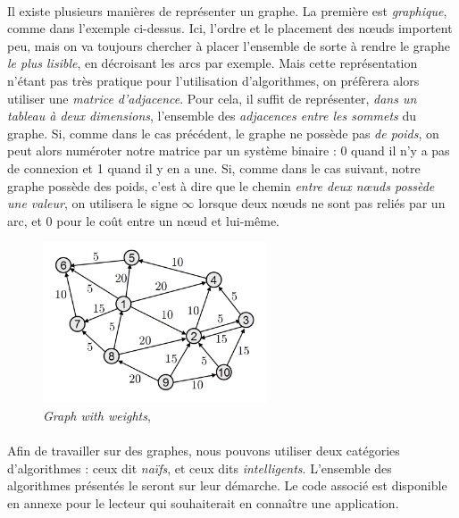 \paragraph{} Il existe plusieurs manières de représenter un graphe. La première est \emph{graphique}, comme dans 
l'exemple ci-dessus. Ici, l'ordre et le placement des n\oe{}uds importent peu, mais on va toujours chercher à placer
l'ensemble de sorte à rendre le graphe \emph{le plus lisible}, en décroisant les arcs par exemple. Mais cette représentation
n'étant pas très pratique pour l'utilisation d'algorithmes, on préfèrera alors utiliser une \emph{matrice d'adjacence}.
Pour cela, il suffit de représenter, \emph{dans un tableau à deux dimensions}, l'ensemble des \emph{adjacences entre les
sommets} du graphe. Si, comme dans le cas précédent, le graphe ne possède pas \emph{de poids}, on peut alors numéroter
notre matrice par un système binaire : 0 quand il n'y a pas de connexion et 1 quand il y en a une. Si, comme dans le cas
suivant, notre graphe possède des poids, c'est à dire que le chemin \emph{entre deux n\oe{}uds possède une valeur}, on
utilisera le signe $\infty$ lorsque deux n\oe{}uds ne sont pas reliés par un arc, et 0 pour le coût entre un n\oe{}ud et
lui-même.

\begin{figure}[h]
    \centering
    \includegraphics[width=250px]{chapters/03/images/weighted_graph.png}
    \caption{\label{weighted_graph}\emph{Graph with weights}, \cite{GraphTheory1}}
\end{figure}

\paragraph{} Afin de travailler sur des graphes, nous pouvons utiliser deux catégories d'algorithmes : ceux dit \emph{naïfs},
et ceux dits \emph{intelligents}. L'ensemble des algorithmes présentés le seront sur leur démarche. Le code associé est
disponible en annexe pour le lecteur qui souhaiterait en connaître une application.


